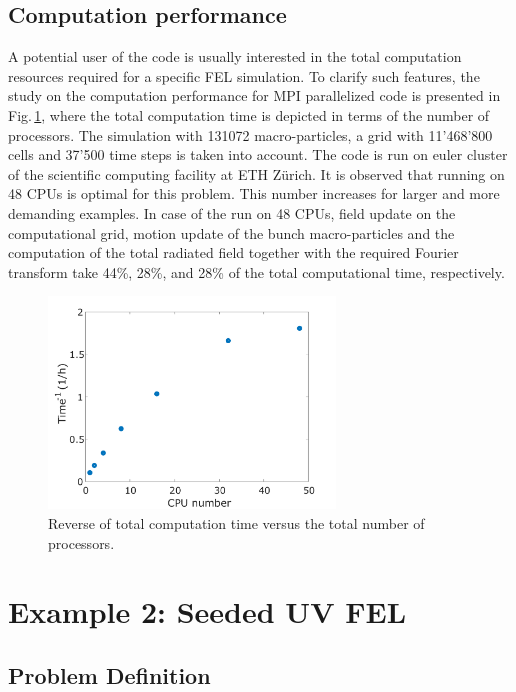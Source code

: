 \subsection{Computation performance}

A potential user of the code is usually interested in the total computation resources required for a specific FEL simulation.
%
To clarify such features, the study on the computation performance for MPI parallelized code is presented in Fig.\,\ref{computationPerformance}, where the total computation time is depicted in terms of the number of processors.
%
The simulation with 131072 macro-particles, a grid with 11'468'800 cells and 37'500 time steps is taken into account.
%
The code is run on euler cluster of the scientific computing facility at ETH Z\"urich.
%
It is observed that running on 48 CPUs is optimal for this problem.
%
This number increases for larger and more demanding examples.
%
In case of the run on 48 CPUs, field update on the computational grid, motion update of the bunch macro-particles and the computation of the total radiated field together with the required Fourier transform take 44\%, 28\%, and 28\% of the total computational time, respectively.
%
\begin{figure}
	\centering
	\includegraphics[width=3.0in]{./MITHRA_EXAMPLES/Fig5/Fig5.pdf}
	\caption{Reverse of total computation time versus the total number of processors.}
	\label{computationPerformance}
\end{figure}

\section{Example 2: Seeded UV FEL}

\subsection{Problem Definition}


